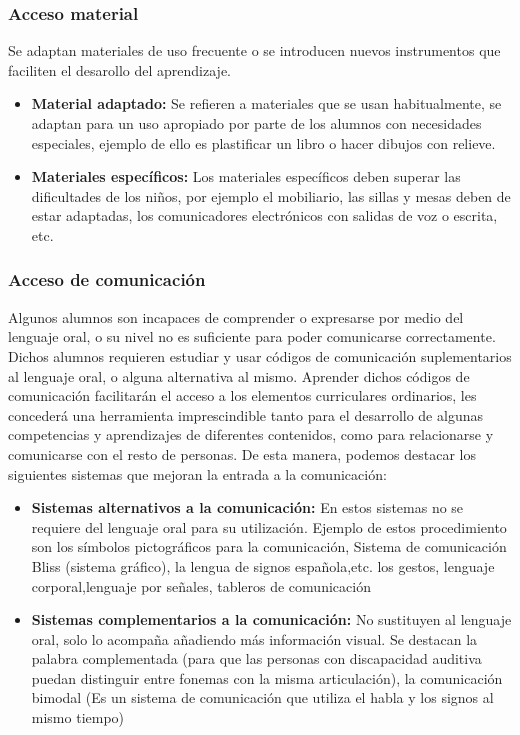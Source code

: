 \subsubsection{Acceso material}
Se adaptan materiales de uso frecuente o se introducen nuevos instrumentos que faciliten el desarollo del aprendizaje.
\begin{itemize}
    \item \textbf{Material adaptado:} Se refieren a materiales que se usan habitualmente, se adaptan para un uso apropiado por parte de los alumnos con necesidades especiales, ejemplo de ello es plastificar un libro o hacer dibujos con relieve.
    \item \textbf{Materiales específicos:} Los materiales específicos deben superar las dificultades de los niños, por ejemplo el mobiliario, las sillas y mesas deben de estar adaptadas, los comunicadores electrónicos con salidas de voz o escrita, etc.
\end{itemize}

\subsubsection{Acceso de comunicación}
Algunos alumnos son incapaces de comprender o expresarse por medio del lenguaje oral, o su nivel no es suficiente para poder comunicarse correctamente. Dichos alumnos requieren estudiar y usar códigos de comunicación suplementarios al lenguaje oral, o alguna alternativa al mismo. Aprender dichos códigos de comunicación facilitarán el acceso a los elementos curriculares ordinarios, les concederá una herramienta imprescindible tanto para el desarrollo de algunas competencias y aprendizajes de diferentes contenidos, como para relacionarse y comunicarse con el resto de personas. De esta manera, podemos destacar los siguientes sistemas que mejoran la  entrada a la comunicación:
\begin{itemize}
    \item \textbf{Sistemas alternativos a la comunicación:} En estos sistemas no se requiere del lenguaje oral para su utilización. Ejemplo de estos procedimiento son los símbolos pictográficos para la comunicación, Sistema de comunicación Bliss (sistema gráfico), la lengua de signos española,etc.
          los gestos, lenguaje corporal,lenguaje por señales, tableros de comunicación

    \item \textbf{Sistemas complementarios a la comunicación:} No sustituyen al lenguaje oral, solo lo acompaña añadiendo más información visual. Se destacan la palabra complementada (para que las personas con discapacidad auditiva puedan distinguir entre fonemas con la misma articulación), la comunicación bimodal (Es un sistema de comunicación que utiliza el habla y los signos al mismo tiempo)
\end{itemize}

